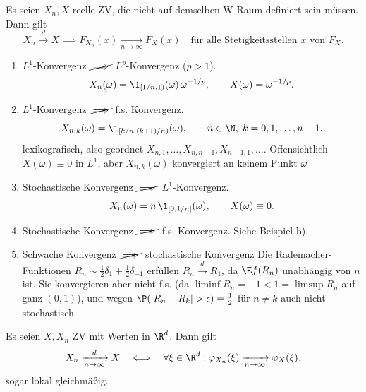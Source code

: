 \documentclass[11pt, a4paper]{article}
\begin{document}
\begin{theorem}
    Es seien $X_n, X$ reelle ZV, die nicht auf demselben W-Raum definiert sein müssen. Dann gilt
    $$X_n \xrightarrow{d} X \implies F_{X_n}(x) \xrightarrow[n \to \infty]{} F_X(x) \quad \text{für alle Stetigkeitsstellen } x \text{ von } F_X.$$
\end{theorem}

\begin{example}[Gegenbeispiele]\Theorem \mbox{}
\begin{enumerate}[label= \alph*)]
\item $L^1$-Konvergenz $\cancel{\implies}$ $L^p$-Konvergenz ($p > 1$).
        $$X_n(\omega) = \1_{[1/n, 1)}(\omega) \, \omega^{-1/p}, \qquad X(\omega) = \omega^{-1/p}.$$
 \item $L^1$-Konvergenz $\cancel\implies$ f.s. Konvergenz.
        $$X_{n,k}(\omega) = \1_{[k/n, (k+1)/n)}(\omega), \qquad n \in \N, \; k = 0, 1, \dots, n-1.$$
        lexikografisch, also geordnet $X_{n,1},\dots, X_{n,n-1}, X_{n+1, 1},\dots$. Offensichtlich $X(\omega) \equiv 0$ in $L^1$, aber $X_{n,k}(\omega)$ konvergiert an keinem Punkt $\omega$
\item Stochastische Konvergenz $\cancel\implies$ $L^1$-Konvergenz.
        $$X_n(\omega) = n \, \1_{[0,1/n]}(\omega), \qquad X(\omega) \equiv 0.$$
\item Stochastische Konvergenz $\cancel\implies$ f.s. Konvergenz. Siehe Beispiel b).

\item Schwache Konvergenz $\cancel\implies$ stochastische Konvergenz \newline
Die Rademacher-Funktionen $R_n \sim \frac{1}{2}\delta_1 + \frac{1}{2}\delta_{-1}$ erfüllen $R_n \xrightarrow{d} R_1$, da $\E f(R_n)$ unabhängig von $n$ ist. Sie konvergieren aber nicht f.s. (da $\liminf R_n = -1 < 1 = \limsup R_n$ auf ganz $(0,1)$), und wegen $\P(|R_n - R_k| > \epsilon) = \frac{1}{2}$ für $n \ne k$ auch nicht stochastisch.
\end{enumerate}
\end{example}

\begin{theorem}[Lévy 1925] \Theorem
    Es seien $X, X_n$ ZV mit Werten in $\R^d$. Dann gilt
    $$X_n \xrightarrow[n \to \infty]{d} X \quad \Longleftrightarrow \quad \forall \xi \in \R^d: \varphi_{X_n}(\xi) \xrightarrow[n \to \infty]{} \varphi_X(\xi).$$ sogar lokal gleichmäßig.
\end{theorem}
\end{document}

